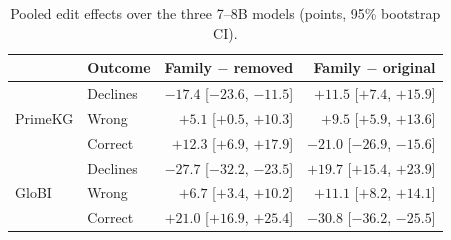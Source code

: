 \begin{table}[t]
\centering
\footnotesize
\setlength{\tabcolsep}{2.5pt}
\begin{tabular}{@{}llrr@{}}
\toprule
 & Outcome & Family $-$ removed & Family $-$ original \\
\midrule
\multirow{3}{*}{PrimeKG} & Declines & $-17.4$ [$-23.6$, $-11.5$] & $+11.5$ [$+7.4$, $+15.9$] \\
 & Wrong & $+5.1$ [$+0.5$, $+10.3$] & $+9.5$ [$+5.9$, $+13.6$] \\
 & Correct & $+12.3$ [$+6.9$, $+17.9$] & $-21.0$ [$-26.9$, $-15.6$] \\
\midrule
\multirow{3}{*}{GloBI} & Declines & $-27.7$ [$-32.2$, $-23.5$] & $+19.7$ [$+15.4$, $+23.9$] \\
 & Wrong & $+6.7$ [$+3.4$, $+10.2$] & $+11.1$ [$+8.2$, $+14.1$] \\
 & Correct & $+21.0$ [$+16.9$, $+25.4$] & $-30.8$ [$-36.2$, $-25.5$] \\
\bottomrule
\end{tabular}
\caption{Pooled edit effects over the three 7--8B models (points, 95\% bootstrap CI).}
\label{tab:edit_pooled}
\end{table}
